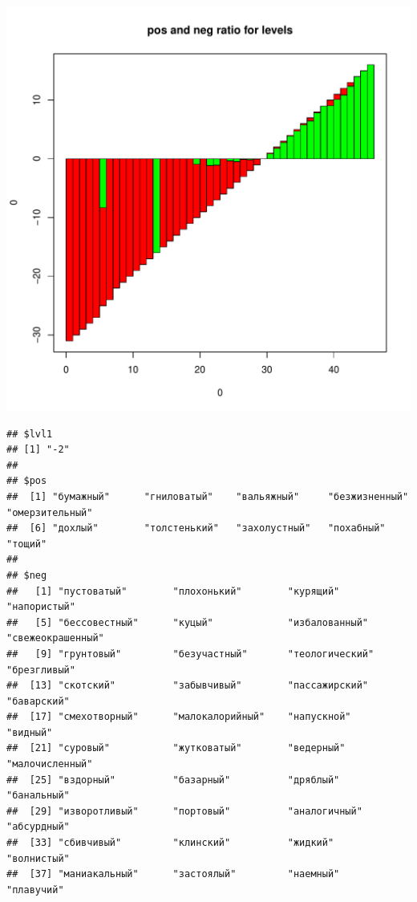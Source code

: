 \documentclass[11pt]{article}\usepackage[]{graphicx}\usepackage[]{color}
\makeatletter
\def\maxwidth{ %
  \ifdim\Gin@nat@width>\linewidth
    \linewidth
  \else
    \Gin@nat@width
  \fi
}
\newenvironment{kframe}{%
 \def\at@end@of@kframe{}%
 \ifinner\ifhmode%
  \def\at@end@of@kframe{\end{minipage}}%
  \begin{minipage}{\columnwidth}%
 \fi\fi%
 \def\FrameCommand##1{\hskip\@totalleftmargin \hskip-\fboxsep
 \colorbox{shadecolor}{##1}\hskip-\fboxsep
     \hskip-\linewidth \hskip-\@totalleftmargin \hskip\columnwidth}%
 \MakeFramed {\advance\hsize-\width
   \@totalleftmargin\z@ \linewidth\hsize
   \@setminipage}}%
 {\par\unskip\endMakeFramed%
 \at@end@of@kframe}
\newenvironment{knitrout}{}{} %
\makeatother
\begin{document}
\begin{knitrout}
\color{fgcolor}
\includegraphics[width=\maxwidth]{figure/unnamed-chunk-8} 
\begin{kframe}\begin{verbatim}
## $lvl1
## [1] "-2"
## 
## $pos
##  [1] "бумажный"      "гниловатый"    "вальяжный"     "безжизненный"  "омерзительный"
##  [6] "дохлый"        "толстенький"   "захолустный"   "похабный"      "тощий"        
## 
## $neg
##   [1] "пустоватый"        "плохонький"        "курящий"           "напористый"       
##   [5] "бессовестный"      "куцый"             "избалованный"      "свежеокрашенный"  
##   [9] "грунтовый"         "безучастный"       "теологический"     "брезгливый"       
##  [13] "скотский"          "забывчивый"        "пассажирский"      "баварский"        
##  [17] "смехотворный"      "малокалорийный"    "напускной"         "видный"           
##  [21] "суровый"           "жутковатый"        "ведерный"          "малочисленный"    
##  [25] "вздорный"          "базарный"          "дряблый"           "банальный"        
##  [29] "изворотливый"      "портовый"          "аналогичный"       "абсурдный"        
##  [33] "сбивчивый"         "клинский"          "жидкий"            "волнистый"        
##  [37] "маниакальный"      "застоялый"         "наемный"           "плавучий"         

\end{verbatim}
\end{kframe}
\end{knitrout}
\end{document}
